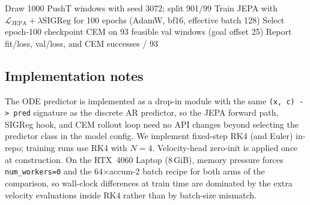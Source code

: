 \begin{algorithm}[t]
\caption{Matched train / eval protocol (discrete vs.\ ODE)}
\label{alg:protocol}
\begin{algorithmic}[1]
\State Draw 1000 PushT windows with seed 3072; split 901/99
\State Train JEPA with $\mathcal{L}_{\mathrm{JEPA}}+\lambda\mathrm{SIGReg}$
      for 100 epochs (AdamW, bf16, effective batch 128)
\State Select epoch-100 checkpoint
\State CEM on 93 feasible val windows (goal offset 25)
\State Report fit/loss, val/loss, and CEM successes / 93
\end{algorithmic}
\end{algorithm}

\subsection{Implementation notes}
\label{sec:impl}

The ODE predictor is implemented as a drop-in module with the same
\texttt{(x, c) -> pred} signature as the discrete AR predictor, so the
JEPA forward path, SIGReg hook, and CEM rollout loop need no API
changes beyond selecting the predictor class in the model config.
We implement fixed-step RK4 (and Euler) in-repo; training runs use
RK4 with $N{=}4$.
Velocity-head zero-init is applied once at construction.
On the RTX~4060 Laptop (8\,GiB), memory pressure forces
\texttt{num\_workers=0} and the 64$\times$accum-2 batch recipe for both
arms of the comparison, so wall-clock differences at train time are
dominated by the extra velocity evaluations inside RK4 rather than by
batch-size mismatch.
